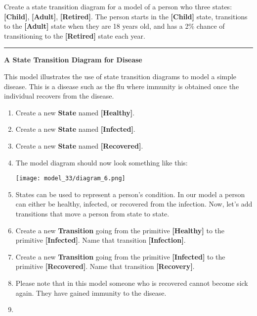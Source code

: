 \documentclass[]{memoir}
\makeatletter
\def\maxwidth{\ifdim\Gin@nat@width>\linewidth\linewidth
\else\Gin@nat@width\fi}
\let\Oldincludegraphics\includegraphics
\renewcommand{\includegraphics}[1]{\Oldincludegraphics[width=\maxwidth]{#1}}
\newcommand{\p}[1]{\textbf{{[}#1{]}}}
\renewcommand{\a}[1]{\textbf{#1}}
\makeatother
\begin{document}
Create a state transition diagram for a model of a person who three
states: \p{Child}, \p{Adult}, \p{Retired}. The person starts in the
\p{Child} state, transitions to the \p{Adult} state when they are 18
years old, and has a 2\% chance of transitioning to the \p{Retired}
state each year.

\begin{center}\rule{3in}{0.4pt}\end{center}

\FloatBarrier 

\begin{oframed}\textbf{A State Transition Diagram for Disease} 

 This model illustrates the use of state transition diagrams to model a simple disease. This is a disease such as the flu where immunity is obtained once the individual recovers from the disease.

\begin{enumerate}
\item Create a new \a{State} named \p{Healthy}.
\item Create a new \a{State} named \p{Infected}.
\item Create a new \a{State} named \p{Recovered}.
\item The model diagram should now look something like this: \par \begin{minipage}{\linewidth}  \centering \texttt{[image: model\_33/diagram\_6.png]}
\end{minipage}
\item 

States can be used to represent a person's condition. In our model a person can either be healthy, infected, or recovered from the infection. Now, let's add transitions that move a person from state to state.


\item Create a new \a{Transition} going from the primitive \p{Healthy} to the primitive \p{Infected}. Name that transition \p{Infection}.
\item Create a new \a{Transition} going from the primitive \p{Infected} to the primitive \p{Recovered}. Name that transition \p{Recovery}.
\item 

Please note that in this model someone who is recovered cannot become sick again. They have gained immunity to the disease. 


\item 


\end{enumerate}
\end{oframed}
\end{document}
